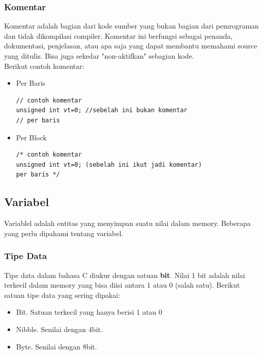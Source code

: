 \documentclass[12pt,]{article}
\begin{document}
	\subsubsection{Komentar}
	Komentar adalah bagian dari kode sumber yang bukan bagian dari pemrograman dan tidak dikompilasi compiler.
	Komentar ini berfungsi sebagai penanda, dokumentasi, penjelasan, atau apa saja yang dapat membantu memahami source yang ditulis.
	Bisa juga sekedar "non-aktifkan" sebagian kode.\\
	Berikut contoh komentar:
	\begin{itemize}
		\item Per Baris
		\begin{verbatim}
// contoh komentar
unsigned int vt=0; //sebelah ini bukan komentar
// per baris
		\end{verbatim}
		
		\item Per Block
		\begin{verbatim}
/* contoh komentar
unsigned int vt=0; (sebelah ini ikut jadi komentar)
per baris */
		\end{verbatim}
	\end{itemize}

	\subsection{Variabel}
	Variablel adalah entitas yang menyimpan suatu nilai dalam memory.
	Beberapa yang perlu dipahami tentang variabel.
	
	\subsubsection{Tipe Data}
	Tipe data dalam bahasa C diukur dengan satuan \textbf{bit}.
	Nilai 1 bit adalah nilai terkecil dalam memory yang bisa diisi antara 1 atau 0 (salah satu).
	Berikut satuan tipe data yang sering dipakai:
	\begin{itemize}
		\item Bit. Satuan terkecil yang hanya berisi 1 atau 0
		\item Nibble. Senilai dengan 4bit.
		\item Byte. Senilai dengan 8bit.
	\end{itemize}
	
\end{document}
